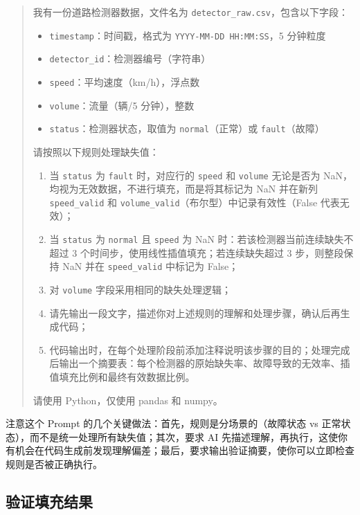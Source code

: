 \begin{quote}
我有一份道路检测器数据，文件名为 \texttt{detector\_raw.csv}，包含以下字段：

\begin{itemize}
  \item \texttt{timestamp}：时间戳，格式为 \texttt{YYYY-MM-DD HH:MM:SS}，5 分钟粒度
  \item \texttt{detector\_id}：检测器编号（字符串）
  \item \texttt{speed}：平均速度（km/h），浮点数
  \item \texttt{volume}：流量（辆/5 分钟），整数
  \item \texttt{status}：检测器状态，取值为 \texttt{normal}（正常）或 \texttt{fault}（故障）
\end{itemize}

请按照以下规则处理缺失值：

\begin{enumerate}
  \item 当 \texttt{status} 为 \texttt{fault} 时，对应行的 \texttt{speed} 和 \texttt{volume} 无论是否为 NaN，均视为无效数据，不进行填充，而是将其标记为 NaN 并在新列 \texttt{speed\_valid} 和 \texttt{volume\_valid}（布尔型）中记录有效性（False 代表无效）；
  \item 当 \texttt{status} 为 \texttt{normal} 且 \texttt{speed} 为 NaN 时：若该检测器当前连续缺失不超过 3 个时间步，使用线性插值填充；若连续缺失超过 3 步，则整段保持 NaN 并在 \texttt{speed\_valid} 中标记为 False；
  \item 对 \texttt{volume} 字段采用相同的缺失处理逻辑；
  \item 请先输出一段文字，描述你对上述规则的理解和处理步骤，确认后再生成代码；
  \item 代码输出时，在每个处理阶段前添加注释说明该步骤的目的；处理完成后输出一个摘要表：每个检测器的原始缺失率、故障导致的无效率、插值填充比例和最终有效数据比例。
\end{enumerate}

请使用 Python，仅使用 pandas 和 numpy。
\end{quote}

注意这个 Prompt 的几个关键做法：首先，规则是分场景的（故障状态 vs 正常状态），而不是统一处理所有缺失值；其次，要求 AI 先描述理解，再执行，这使你有机会在代码生成前发现理解偏差；最后，要求输出验证摘要，使你可以立即检查规则是否被正确执行。

\subsection{验证填充结果}

